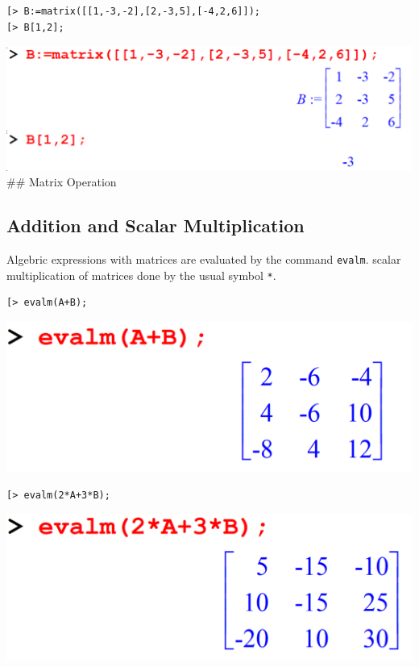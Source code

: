 \documentclass[
]{book}
\theoremstyle{definition}
\theoremstyle{definition}
\theoremstyle{definition}
\theoremstyle{definition}
\theoremstyle{remark}
\begin{document}
\begin{verbatim}
[> B:=matrix([[1,-3,-2],[2,-3,5],[-4,2,6]]);
[> B[1,2];
\end{verbatim}

\includegraphics{figures/Lesson 4/fig23.png}
\#\# Matrix Operation

\subsection{Addition and Scalar Multiplication}\label{addition-and-scalar-multiplication}

Algebric expressions with matrices are evaluated by the command \texttt{evalm}. scalar multiplication of matrices done by the usual symbol \texttt{*}.

\begin{verbatim}
[> evalm(A+B);
\end{verbatim}

\includegraphics{figures/Lesson 4/fig24.png}

\begin{verbatim}
[> evalm(2*A+3*B);
\end{verbatim}

\includegraphics{figures/Lesson 4/fig25.png}
\end{document}
